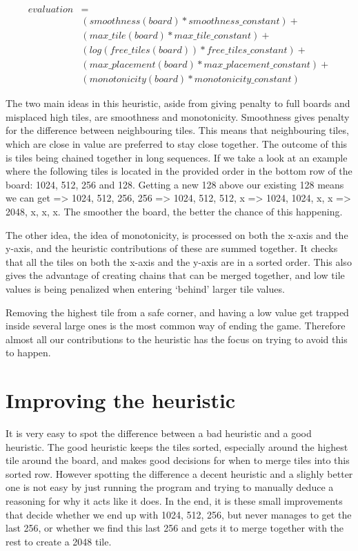 \begin{equation}
\begin{split}
	evaluation &= \\
        &( smoothness(board) * smoothness\_constant ) + \\
        &( max\_tile(board) * max\_tile\_constant ) + \\
        &( log(free\_tiles(board)) * free\_tiles\_constant ) + \\
        &( max\_placement(board) * max\_placement\_constant ) + \\
        &( monotonicity(board) * monotonicity\_constant )
\end{split}
\end{equation}

The two main ideas in this heuristic, aside from giving penalty to full boards and
misplaced high tiles, are smoothness and monotonicity. Smoothness gives penalty
for the difference between neighbouring tiles. This means that neighbouring tiles,
which are close in value are preferred to stay close together. The outcome of this is
tiles being chained together in long sequences. If we take a look at an example where the following tiles is located in the provided order in the bottom row of the board: 1024, 512, 256 and 128. Getting a new 128 above our existing 128
means we can get => 1024, 512, 256, 256 => 1024, 512, 512, x => 1024, 1024, x, x =>
2048, x, x, x. The smoother the board, the better the chance of this happening.

The other idea, the idea of monotonicity, is processed on both the x-axis and the y-axis, and
the heuristic contributions of these are summed together. It checks that all the tiles
on both the x-axis and the y-axis are in a sorted order. This also gives the advantage of
creating chains that can be merged together, and low tile values is being penalized when
entering `behind' larger tile values.

Removing the highest tile from a safe corner, and having a low value get trapped
inside several large ones is the most common way of ending the game. Therefore
almost all our contributions to the heuristic has the focus on trying to avoid this to happen.

\section{Improving the heuristic}

It is very easy to spot the difference between a bad heuristic and a good heuristic.
The good heuristic keeps the tiles sorted, especially around the highest tile around
the board, and makes good decisions for when to merge tiles into this sorted row.
However spotting the difference a decent heuristic and a slighly better one is not
easy by just running the program and trying to manually deduce a reasoning for why
it acts like it does. In the end, it is these small improvements that decide whether
we end up with 1024, 512, 256, but never manages to get the last 256, or whether
we find this last 256 and gets it to merge together with the rest to create a 2048 tile.

